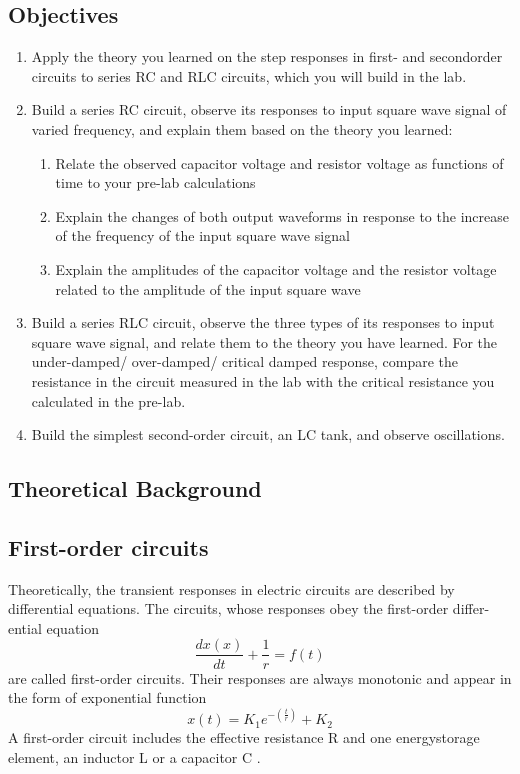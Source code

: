 \documentclass{article}
\begin{document}
\subsection{Objectives}
\begin{enumerate}
	\item Apply the theory you learned on the step responses in first- and secondorder circuits to series RC and RLC circuits, which you will build in the lab.
	\item Build a series RC circuit, observe its responses to input square wave
	signal of varied frequency, and explain them based on the theory you learned:
	\begin{enumerate}
		\item Relate the observed capacitor voltage and resistor voltage as functions
		of time to your pre-lab calculations
		\item Explain the changes of both output waveforms in response to the
		increase of the frequency of the input square wave signal
		\item Explain the amplitudes of the capacitor voltage and the resistor voltage
		related to the amplitude of the input square wave
	\end{enumerate}
	\item Build a series RLC circuit, observe the three types of its responses to
	input square wave signal, and relate them to the theory you have learned. For
	the under-damped/ over-damped/ critical damped response, compare the
	resistance in the circuit measured in the lab with the critical resistance you
	calculated in the pre-lab.
	\item Build the simplest second-order circuit, an LC tank, and observe oscillations.
\end{enumerate}
\subsection{Theoretical Background}
\subsection{First-order circuits}
Theoretically, the transient responses in electric circuits are described by
differential equations. The circuits, whose responses obey the first-order
differ-ential equation
$$\frac{dx(x)}{dt}+\frac{1}{r}=f(t)$$
are called first-order circuits. Their responses are always monotonic and
appear in the form of exponential function
$$x(t)=K_1e^{-(\frac{t}{r})}+K_2$$
A first-order circuit includes the effective resistance R and one energystorage element, an inductor L or a capacitor C .
\end{document}
